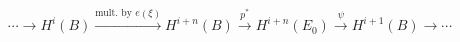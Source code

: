 $$\cdots \rightarrow H^i(B) \xrightarrow{\text{mult. by } e(\xi)} H^{i+n}(B) \xrightarrow{p^*} H^{i+n}(E_0) \xrightarrow{\psi} H^{i+1}(B) \rightarrow \cdots$$
